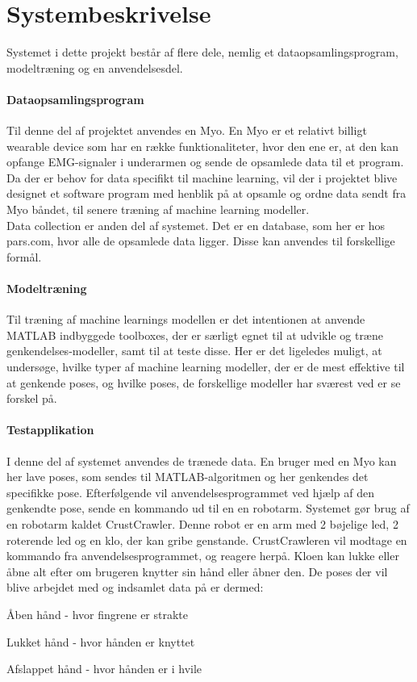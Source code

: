 \thispagestyle{fancy}
\chapter{Systembeskrivelse}
\label{chp:systembeskrivelse}

Systemet i dette projekt består af flere dele, nemlig et dataopsamlingsprogram, modeltræning og en anvendelsesdel.
\subsubsection{Dataopsamlingsprogram}
Til denne del af projektet anvendes en Myo. En Myo er et relativt billigt wearable device som har en række funktionaliteter, hvor den ene er, at den kan opfange EMG-signaler i underarmen og sende de opsamlede data til et program.\\
Da der er behov for data specifikt til machine learning, vil der i projektet blive designet et software program med henblik på at opsamle og ordne data sendt fra Myo båndet, til senere træning af machine learning modeller.\\
Data collection er anden del af systemet. Det er en database, som her er hos pars.com, hvor alle de opsamlede data ligger. Disse kan anvendes til forskellige formål.

\subsubsection{Modeltræning}
Til træning af machine learnings modellen er det intentionen at anvende MATLAB indbyggede toolboxes, der er særligt egnet til at udvikle og træne genkendelses-modeller, samt til at teste disse. 
Her er det ligeledes muligt, at undersøge, hvilke typer af machine learning modeller, der er de mest effektive til at genkende poses, og hvilke poses, de forskellige modeller har sværest ved er se forskel på.

\subsubsection{Testapplikation}
I denne del af systemet anvendes de trænede data. En bruger med en Myo kan her lave poses, som sendes til MATLAB-algoritmen og her genkendes det specifikke pose. Efterfølgende vil anvendelsesprogrammet ved hjælp af den genkendte pose, sende en kommando ud til en en robotarm. Systemet gør brug af en robotarm kaldet CrustCrawler. Denne robot er en arm med 2 bøjelige led, 2 roterende led og en klo, der kan gribe genstande. CrustCrawleren vil modtage en kommando fra anvendelsesprogrammet, og reagere herpå. Kloen kan lukke eller åbne alt efter om brugeren knytter sin hånd eller åbner den. De poses der vil blive arbejdet med og indsamlet data på er dermed:
\begin{myItemize}
	\item Åben hånd - hvor fingrene er strakte
	\item Lukket hånd - hvor hånden er knyttet
	\item Afslappet hånd - hvor hånden er i hvile
\end{myItemize}


